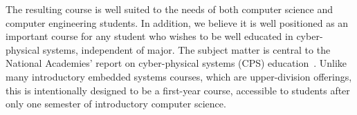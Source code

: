 The resulting course is well suited to the needs of
both computer science and computer engineering students.
In addition, we believe it is well positioned as an important course for
any student who wishes to be well educated in cyber-physical systems,
independent of major.
The subject matter is central to the National Academies' report on
cyber-physical systems (CPS) education~\cite{nasem16}.
Unlike many introductory embedded systems courses, which are upper-division
offerings, this is intentionally
designed to be a first-year course, accessible to students after only
one semester of introductory computer science.

